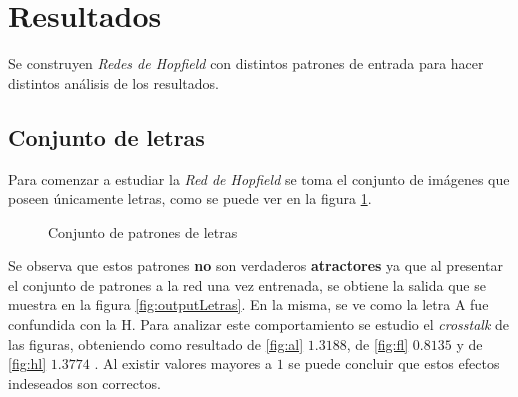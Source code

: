 \documentclass{sig-alternate}
\begin{document}
\section*{Resultados }

Se construyen \textit{Redes de Hopfield} con distintos patrones de entrada para hacer distintos análisis de los resultados.

\subsection*{ Conjunto de letras}

Para comenzar a estudiar la \textit{Red de Hopfield} se toma el conjunto de imágenes que poseen únicamente letras, como se puede ver en la figura \ref{fig:letras}.

	\begin{figure}[h]
		\begin{center}
			\hspace{20pt}
			\hspace{20pt}
		\end{center}
	\caption{Conjunto de patrones de letras}
	\label{fig:letras}
	\end{figure}

 Se observa que estos patrones \textbf{no} son verdaderos \textbf{atractores} ya que al presentar el conjunto de patrones a la red una vez entrenada, se obtiene la salida que se muestra en la figura \ref{fig:outputLetras}. En la misma, se ve como la letra A fue confundida con la H. Para analizar este comportamiento se estudio el \textit{crosstalk} de las figuras, obteniendo como resultado de \ref{fig:al}  $1.3188$, de \ref{fig:fl} $0.8135$ y de \ref{fig:hl} $1.3774$ . Al existir valores mayores a $1$ se puede concluir que estos efectos indeseados son correctos.
\end{document}
